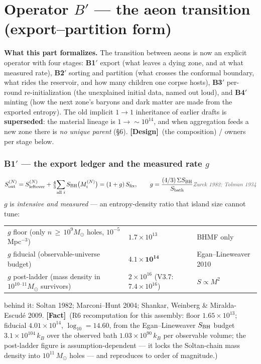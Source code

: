\documentclass[11pt]{article}
\newcommand{\Fact}{\textbf{\textcolor{green!45!black}{[Fact]}}}
\newcommand{\Design}{\textbf{\textcolor{purple!65!black}{[Design]}}}
\newcommand{\own}[1]{\hfill{\small\textcolor{gray!70!black}{\textit{#1}}}}
\begin{document}
\clearpage

\part{Operator $B'$ --- the aeon transition (export--partition form)}
\setcounter{section}{0}\setcounter{equation}{0}\setcounter{figure}{0}

\noindent\textbf{What this part formalizes.} The transition between aeons is now an explicit operator with four stages: \textbf{B1$'$} export (what leaves a dying zone, and at what measured rate), \textbf{B2$'$} sorting and partition (what crosses the conformal boundary, what rides the reservoir, and how many children one corpse hosts), \textbf{B3$'$} per-round re-initialization (the unexplained initial data, named out loud), and \textbf{B4$'$} minting (how the next zone's baryons and dark matter are made from the exported entropy). The old implicit $1\to1$ inheritance of earlier drafts is \textbf{superseded}: the material lineage is $1\to\sim\!10^{14}$, and when aggregation feeds a new zone there is \emph{no unique parent} (\S6). \Design\ (the composition) / owners per stage below.

\section{B1$'$ --- the export ledger and the measured rate $g$}
\begin{equation}
S_{\rm out}^{(N)}=S_{\rm leftover}^{(N)}+\tfrac43\!\sum_{\text{all }i}S_{\rm BH}\bigl(M_i^{(N)}\bigr)=(1+g)\,S_{\rm fix},
\qquad g=\frac{(4/3)\,\Sigma S_{\rm BH}}{S_{\rm bath}}
\own{Zurek 1982; Tolman 1934}
\label{eq:b1export}
\end{equation}
$g$ is \emph{intensive and measured} --- an entropy-density ratio that island size cannot tune:
\begin{center}\small
\begin{tabular}{lll}\toprule
$g$ floor (only $n\,{\ge}\,10^9M_\odot$ holes, $10^{-5}\,$Mpc$^{-3}$) & $1.7\times10^{13}$ & BHMF only\\
$g$ fiducial (observable-universe budget) & $\mathbf{4.1\times10^{14}}$ & Egan--Lineweaver 2010\\
$g$ post-ladder (mass density in $10^{10\text{--}11}M_\odot$ survivors) & $2\times10^{16}$ (V3.7: $7.4\times10^{16}$) & $S\propto M^2$\\\bottomrule
\end{tabular}\end{center}
behind it: Soltan 1982; Marconi--Hunt 2004; Shankar, Weinberg \& Miralda-Escud\'e 2009. \Fact\ (R6 recomputation for this assembly: floor $1.65\times10^{13}$; fiducial $4.01\times10^{14}$, $\log_{10}=14.60$, from the Egan--Lineweaver $S_{\rm BH}$ budget $3.1\times10^{104}\,k_B$ over the observed bath $1.03\times10^{90}\,k_B$ per observable volume; the post-ladder figure is assumption-dependent --- it locks the Soltan-chain mass density into $10^{11}\,M_\odot$ holes --- and reproduces to order of magnitude.)
\end{document}
